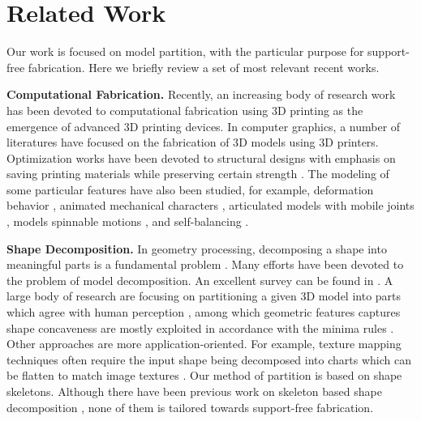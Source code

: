 \section{Related Work}

Our work is focused on model partition, with the particular purpose for support-free fabrication. Here we briefly review a set of most relevant recent works.

\textbf{Computational Fabrication.} Recently, an increasing body of research work has been devoted to computational fabrication using 3{D} printing as the emergence of advanced 3{D} printing devices. In computer graphics, a number of literatures have focused on the fabrication of 3{D} models using 3{D} printers. Optimization works have been devoted to structural designs with emphasis on saving printing materials while preserving certain strength \cite{StavaVBCM12,ZhouPZ13,WangWYLTTDCL13,Umetani:2013:CSA,LuSZWFCSTCC14}. The modeling of some particular features have also been studied, for example, deformation behavior \cite{SkourasTCBG13}, animated mechanical characters \cite{CorosTNSFSMB13,CeylanLMAP13}, articulated models with mobile joints \cite{BacherBJP12,CaliCAKSKW12}, models spinnable motions \cite{Bacher14}, and self-balancing \cite{PrevostWLS13}.


\textbf{Shape Decomposition.} In geometry processing, decomposing a shape into meaningful parts is a fundamental problem \cite{Kaick:2014:SSA}. Many efforts have been devoted to the problem of model decomposition. An excellent survey can be found in \cite{Shamir08}. A large body of research are focusing on partitioning a given 3{D} model into parts which agree with human perception \cite{KatzT03,KatzLT05,JiLCW06,LiuZ07,Golovinskiy:2008,ChenGF09,KaickFKAC14}, among which geometric features captures shape concaveness are mostly exploited in accordance with the minima rules \cite{hoffman1984parts,hoffman1997salience}. Other approaches are more application-oriented. For example, texture mapping techniques often require the input shape being decomposed into charts which can be flatten to match image textures \cite{zhou2004iso,Garcia:2008:IIG}. Our method of partition is based on shape skeletons. Although there have been previous work on skeleton based shape decomposition \cite{lien2006simultaneous,reniers2007skeleton,AuTCCL08}, none of them is tailored towards support-free fabrication.


